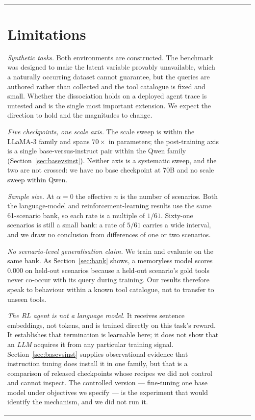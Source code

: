\documentclass[11pt]{article}
\begin{document}
\begin{table}[t]
\begin{tabular}{lcccc}
\section{Limitations}
\label{sec:limitations}

\emph{Synthetic tasks.} Both environments are constructed. The benchmark was
designed to make the latent variable provably unavailable, which a naturally
occurring dataset cannot guarantee, but the queries are authored rather than
collected and the tool catalogue is fixed and small. Whether the dissociation
holds on a deployed agent trace is untested and is the single most important
extension. We expect the direction to hold and the magnitudes to change.

\emph{Five checkpoints, one scale axis.} The scale sweep is within the LLaMA-3
family and spans $70\times$ in parameters; the post-training axis is a single
base-versus-instruct pair within the Qwen family (Section~\ref{sec:basevsinst}).
Neither axis is a systematic sweep, and the two are not crossed: we have no base
checkpoint at 70B and no scale sweep within Qwen.

\emph{Sample size.} At $\alpha=0$ the effective $n$ is the number of scenarios.
Both the language-model and reinforcement-learning results use the same
61-scenario bank, so each rate is a multiple of $1/61$. Sixty-one scenarios is
still a small bank: a rate of $5/61$ carries a wide interval, and we draw no
conclusion from differences of one or two scenarios.

\emph{No scenario-level generalisation claim.} We train and evaluate on the same
bank. As Section~\ref{sec:bank} shows, a memoryless model scores 0.000 on held-out
scenarios because a held-out scenario's gold tools never co-occur with its query
during training. Our results therefore speak to behaviour within a known tool
catalogue, not to transfer to unseen tools.

\emph{The RL agent is not a language model.} It receives sentence embeddings, not
tokens, and is trained directly on this task's reward. It establishes that
termination is learnable here; it does not show that an \emph{LLM} acquires it
from any particular training signal. Section~\ref{sec:basevsinst} supplies
observational evidence that instruction tuning does install it in one family, but
that is a comparison of released checkpoints whose recipes we did not control and
cannot inspect. The controlled version --- fine-tuning one base model under
objectives we specify --- is the experiment that would identify the mechanism, and
we did not run it.


\end{tabular}
\end{table}
\end{document}
